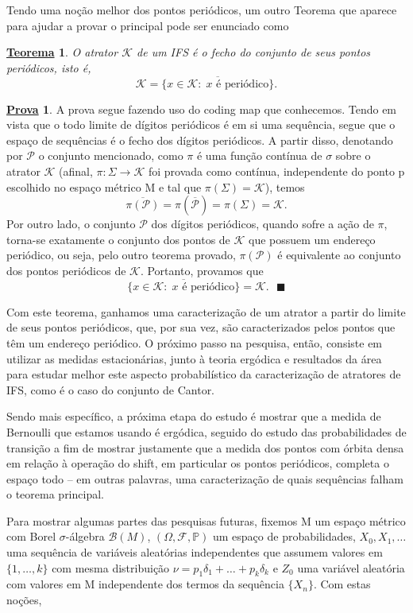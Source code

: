 \documentclass[12pt]{article}
\newtheorem*{theorem*}{\underline{Teorema}}
\theoremstyle{definition}
\newtheorem*{proof*}{\underline{Prova}}
\renewcommand\qedsymbol{$\blacksquare$}
\begin{document}
Tendo uma noção melhor dos pontos periódicos, um outro Teorema que aparece para ajudar a provar o principal pode ser enunciado como
\begin{theorem*}
	O atrator \(\mathcal{K}\) de um IFS é o fecho do conjunto de seus pontos periódicos, isto é,
	\[
		\mathcal{K} = \overline{\{x\in \mathcal{K}:\; x\text{ é periódico}\}}.
	\]
\end{theorem*}
\begin{proof*}
	A prova segue fazendo uso do coding map que conhecemos. Tendo em vista que o todo limite de dígitos periódicos é em si uma sequência, segue que o espaço de sequências é o fecho dos dígitos periódicos.
	A partir disso, denotando por \(\mathcal{P}\) o conjunto mencionado, como \(\pi \) é uma função contínua de \(\sigma \) sobre o atrator \(\mathcal{K}\) (afinal, \(\pi :\Sigma \rightarrow \mathcal{K}\) foi provada como contínua, independente do ponto p escolhido no espaço métrico M e tal que \(\pi (\Sigma ) = \mathcal{K}\)), temos
	\[
		\overline{\pi (\mathcal{P})} = \pi (\overline{\mathcal{P}}) = \pi (\Sigma ) = \mathcal{K}.
	\]
	Por outro lado, o conjunto \(\mathcal{P}\) dos dígitos periódicos, quando sofre a ação de \(\pi \), torna-se exatamente o conjunto dos pontos de \(\mathcal{K}\) que possuem um endereço periódico, ou seja, pelo outro teorema provado, \(\pi (\mathcal{P})\) é equivalente ao conjunto dos pontos periódicos de \(\mathcal{K}\). Portanto, provamos que
	\[
		\overline{\{x\in \mathcal{K}:\; x\text{ é periódico}\}} = \mathcal{K}. \text{ \qedsymbol}
	\]
\end{proof*}

Com este teorema, ganhamos uma caracterização de um atrator a partir do limite de seus pontos periódicos, que, por sua vez, são caracterizados pelos pontos que têm um endereço periódico. O próximo passo na pesquisa, então, consiste em utilizar as medidas estacionárias, junto à teoria ergódica e resultados da área para estudar melhor este aspecto probabilístico da caracterização de atratores de IFS, como é o caso do conjunto de Cantor.

Sendo mais específico, a próxima etapa do estudo é mostrar que a medida de Bernoulli que estamos usando é ergódica, seguido do estudo das probabilidades de transição a fim de mostrar justamente que a medida dos pontos com órbita densa em relação à operação do shift, em particular os pontos periódicos, completa o espaço todo -- em outras palavras, uma caracterização de quais sequências falham o teorema principal.

Para mostrar algumas partes das pesquisas futuras, fixemos M um espaço métrico com Borel \(\sigma \)-álgebra \(\mathcal{B}(M)\), \((\Omega , \mathcal{F}, \mathbb{P})\) um espaço de probabilidades, \({X_{0},X_1,\dotsc }\) uma sequência de variáveis aleatórias independentes que assumem valores em \(\{1,\dotsc ,k\}\) com mesma distribuição \(\nu =p_1\delta_1+\dotsc +p_{k}\delta_{k}\) e \(Z_{0}\) uma variável aleatória com valores em M independente dos termos da sequência \(\{X_{n}\}\). Com estas noções,
\end{document}
